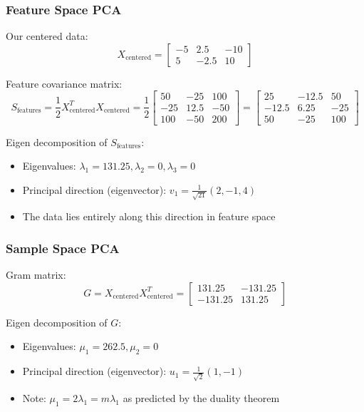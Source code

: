\begin{notechapter}
\subsubsection*{Feature Space PCA}

Our centered data:
\[
X_{\text{centered}} = \begin{bmatrix}
-5 & 2.5 & -10 \\
5 & -2.5 & 10
\end{bmatrix}
\]

Feature covariance matrix:
\[
S_{\text{features}} = \frac{1}{2}X_{\text{centered}}^T X_{\text{centered}} = \frac{1}{2}
\begin{bmatrix}
50 & -25 & 100 \\
-25 & 12.5 & -50 \\
100 & -50 & 200
\end{bmatrix}
= \begin{bmatrix}
25 & -12.5 & 50 \\
-12.5 & 6.25 & -25 \\
50 & -25 & 100
\end{bmatrix}
\]

Eigen decomposition of $S_{\text{features}}$:
\begin{itemize}
    \item Eigenvalues: $\lambda_1 = 131.25, \lambda_2 = 0, \lambda_3 = 0$
    \item Principal direction (eigenvector): $v_1 = \frac{1}{\sqrt{21}}(2, -1, 4)$
    \item The data lies entirely along this direction in feature space
\end{itemize}

\subsubsection*{Sample Space PCA}

Gram matrix:
\[
G = X_{\text{centered}} X_{\text{centered}}^T = \begin{bmatrix}
131.25 & -131.25 \\
-131.25 & 131.25
\end{bmatrix}
\]

Eigen decomposition of $G$:
\begin{itemize}
    \item Eigenvalues: $\mu_1 = 262.5, \mu_2 = 0$
    \item Principal direction (eigenvector): $u_1 = \frac{1}{\sqrt{2}}(1, -1)$
    \item Note: $\mu_1 = 2\lambda_1 = m\lambda_1$ as predicted by the duality theorem
\end{itemize}


\end{notechapter}
